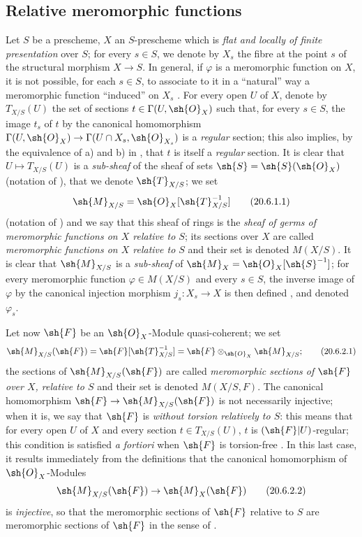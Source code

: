 \subsection{Relative meromorphic functions}
\label{IV.20.6}

\begin{env}[20.6.1]
\label{IV.20.6.1}
Let $S$ be a prescheme, $X$ an $S$-prescheme which is \emph{flat and locally of finite presentation} over $S$;
for every $s\in S$, we denote by $X_s$ the fibre at the point $s$ of the structural morphism $X\to S$.
In general, if $\varphi$ is a meromorphic function on $X$, it is not possible, for each $s\in S$, to associate to it in a ``natural'' way a meromorphic function ``induced'' on $X_s$ .
For every open $U$ of $X$, denote by $T_{X/S}(U)$ the set of sections $t\in\Gamma(U,\sh{O}_X)$ such that, for every $s\in S$, the image $t_s$ of $t$ by the canonical homomorphism $\Gamma(U,\sh{O}_X)\to\Gamma(U\cap X_s,\sh{O}_{X_s})$ is a \emph{regular} section;
this also implies, by the equivalence of a) and b) in , that $t$ is itself a \emph{regular} section.
It is clear that $U\mapsto T_{X/S}(U)$ is a \emph{sub-sheaf} of the sheaf of sets $\sh{S}=\sh{S}(\sh{O}_X)$ (notation of ), that we denote $\sh{T}_{X/S}$;
we set
\[
\label{IV.20.6.1.1}
  \sh{M}_{X/S}=\sh{O}_X[\sh{T}_{X/S}^{-1}]
  \tag{20.6.1.1}
\]
(notation of ) and we say that this sheaf of rings is the \emph{sheaf of germs of meromorphic functions on $X$ relative to $S$};
its sections over $X$ are called \emph{meromorphic functions on $X$ relative to $S$} and their set is denoted $M(X/S)$.
It is clear that $\sh{M}_{X/S}$ is a \emph{sub-sheaf} of $\sh{M}_X=\sh{O}_X[\sh{S}^{-1}]$;
for every meromorphic function $\varphi\in M(X/S)$ and every $s\in S$, the inverse image of $\varphi$ by the canonical injection morphism $j_s:X_s\to X$ is then defined , and denoted $\varphi_s$.
\end{env}

\begin{env}[20.6.2]
\label{IV.20.6.2}
Let now $\sh{F}$ be an $\sh{O}_X$-Module quasi-coherent;
we set
\[
\label{IV.20.6.2.1}
  \sh{M}_{X/S}(\sh{F})=\sh{F}[\sh{T}_{X/S}^{-1}]=\sh{F}\otimes_{\sh{O}_X}\sh{M}_{X/S};
  \tag{20.6.2.1}
\]
the sections of $\sh{M}_{X/S}(\sh{F})$ are called \emph{meromorphic sections of $\sh{F}$ over $X$, relative to $S$} and their set is denoted $M(X/S,F)$.
The canonical homomorphism $\sh{F}\to\sh{M}_{X/S}(\sh{F})$ is not necessarily injective;
when it is, we say that $\sh{F}$ is \emph{without torsion relatively to $S$}:
this means that for every open $U$ of $X$ and every section $t\in T_{X/S}(U)$, $t$ is $(\sh{F}|U)$-regular;
this condition is satisfied \emph{a fortiori} when $\sh{F}$ is torsion-free .
In this last case, it results immediately from the definitions  that the canonical homomorphism of $\sh{O}_X$-Modules
\[
\label{IV.20.6.2.2}
  \sh{M}_{X/S}(\sh{F})\to\sh{M}_X(\sh{F})
  \tag{20.6.2.2}
\]
is \emph{injective}, so that the meromorphic sections of $\sh{F}$ relative to $S$ are meromorphic sections of $\sh{F}$ in the sense of .
\end{env}


